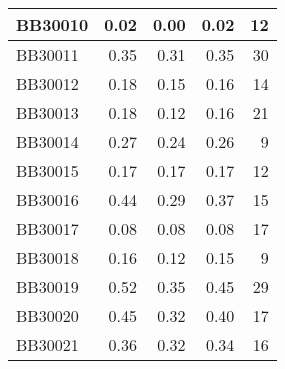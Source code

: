 \begin{longtable}{|l|r|r|r||r|}
	\hline
	BB30010 & \cellcolor[rgb]{ .988,  1,  .992}0.02 & \cellcolor[rgb]{ .384,  .745,  .478}0.00 & \cellcolor[rgb]{ .937,  .976,  .949}0.02 & \cellcolor[rgb]{ .984,  .761,  .769}12 \\
	\hline
	BB30011 & \cellcolor[rgb]{ .988,  1,  .992}0.35 & \cellcolor[rgb]{ .384,  .745,  .478}0.31 & \cellcolor[rgb]{ .894,  .957,  .91}0.35 & \cellcolor[rgb]{ .973,  .412,  .42}30 \\
	\hline
	BB30012 & \cellcolor[rgb]{ .988,  1,  .992}0.18 & \cellcolor[rgb]{ .384,  .745,  .478}0.15 & \cellcolor[rgb]{ .596,  .835,  .659}0.16 & \cellcolor[rgb]{ .984,  .722,  .729}14 \\
	\hline
	BB30013 & \cellcolor[rgb]{ .988,  1,  .992}0.18 & \cellcolor[rgb]{ .384,  .745,  .478}0.12 & \cellcolor[rgb]{ .761,  .902,  .8}0.16 & \cellcolor[rgb]{ .98,  .588,  .596}21 \\
	\hline
	BB30014 & \cellcolor[rgb]{ .988,  1,  .992}0.27 & \cellcolor[rgb]{ .384,  .745,  .478}0.24 & \cellcolor[rgb]{ .851,  .941,  .875}0.26 & \cellcolor[rgb]{ .984,  .816,  .827}9 \\
	\hline
	BB30015 & \cellcolor[rgb]{ .988,  1,  .992}0.17 & \cellcolor[rgb]{ .988,  1,  .992}0.17 & \cellcolor[rgb]{ .988,  1,  .992}0.17 & \cellcolor[rgb]{ .984,  .761,  .769}12 \\
	\hline
	BB30016 & \cellcolor[rgb]{ .988,  1,  .992}0.44 & \cellcolor[rgb]{ .384,  .745,  .478}0.29 & \cellcolor[rgb]{ .714,  .882,  .757}0.37 & \cellcolor[rgb]{ .98,  .702,  .71}15 \\
	\hline
	BB30017 & \cellcolor[rgb]{ .988,  1,  .992}0.08 & \cellcolor[rgb]{ .988,  1,  .992}0.08 & \cellcolor[rgb]{ .988,  1,  .992}0.08 & \cellcolor[rgb]{ .98,  .663,  .675}17 \\
	\hline
	BB30018 & \cellcolor[rgb]{ .988,  1,  .992}0.16 & \cellcolor[rgb]{ .384,  .745,  .478}0.12 & \cellcolor[rgb]{ .808,  .922,  .839}0.15 & \cellcolor[rgb]{ .984,  .816,  .827}9 \\
	\hline
	BB30019 & \cellcolor[rgb]{ .988,  1,  .992}0.52 & \cellcolor[rgb]{ .384,  .745,  .478}0.35 & \cellcolor[rgb]{ .729,  .89,  .769}0.45 & \cellcolor[rgb]{ .976,  .431,  .439}29 \\
	\hline
	BB30020 & \cellcolor[rgb]{ .988,  1,  .992}0.45 & \cellcolor[rgb]{ .384,  .745,  .478}0.32 & \cellcolor[rgb]{ .753,  .898,  .792}0.40 & \cellcolor[rgb]{ .98,  .663,  .675}17 \\
	\hline
	BB30021 & \cellcolor[rgb]{ .988,  1,  .992}0.36 & \cellcolor[rgb]{ .384,  .745,  .478}0.32 & \cellcolor[rgb]{ .663,  .863,  .714}0.34 & \cellcolor[rgb]{ .98,  .682,  .694}16 \\

\end{longtable}
